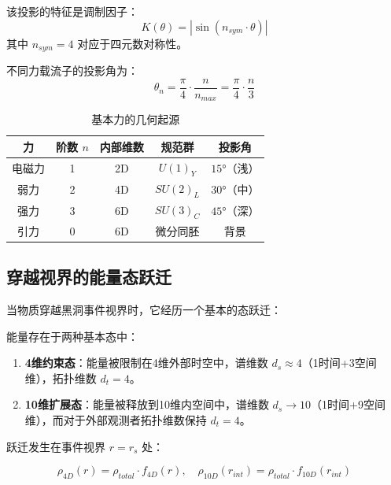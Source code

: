 该投影的特征是调制因子：
\begin{equation}
    K(\theta) = |\sin(n_{sym} \cdot \theta)|
    \label{eq:kaleidoscope_factor}
\end{equation}
其中 $n_{sym} = 4$ 对应于四元数对称性。

不同力载流子的投影角为：
\begin{equation}
    \theta_n = \frac{\pi}{4} \cdot \frac{n}{n_{max}} = \frac{\pi}{4} \cdot \frac{n}{3}
    \label{eq:projection_angles}
\end{equation}

\begin{table}[htbp]
\centering
\caption{基本力的几何起源}
\begin{tabular}{@{}ccccc@{}}
\toprule
力 & 阶数 $n$ & 内部维数 & 规范群 & 投影角 \\
\midrule
电磁力 & 1 & 2D & $U(1)_Y$ & $15°$（浅） \\
弱力 & 2 & 4D & $SU(2)_L$ & $30°$（中） \\
强力 & 3 & 6D & $SU(3)_C$ & $45°$（深） \\
引力 & 0 & 6D & 微分同胚 & 背景 \\
\bottomrule
\end{tabular}
\label{tab:force_origins}
\end{table}

\subsection{穿越视界的能量态跃迁}

当物质穿越黑洞事件视界时，它经历一个基本的态跃迁：

\begin{axiom}[能量态对偶性]
能量存在于两种基本态中：
\begin{enumerate}
    \item \textbf{4维约束态}：能量被限制在4维外部时空中，谱维数 $d_s \approx 4$（1时间+3空间维），拓扑维数 $d_t = 4$。
    \item \textbf{10维扩展态}：能量被释放到10维内空间中，谱维数 $d_s \to 10$（1时间+9空间维），而对于外部观测者拓扑维数保持 $d_t = 4$。
\end{enumerate}
\end{axiom}

跃迁发生在事件视界 $r = r_s$ 处：

\begin{equation}
    \rho_{4D}(r) = \rho_{total} \cdot f_{4D}(r), \quad \rho_{10D}(r_{int}) = \rho_{total} \cdot f_{10D}(r_{int})
\end{equation}


